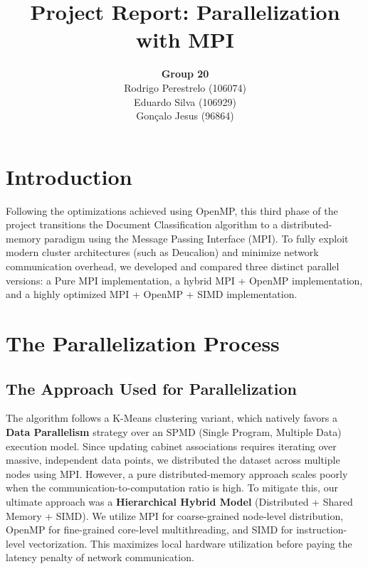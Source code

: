 \documentclass[12pt,a4paper]{article}
\title{\textbf{Project Report: Parallelization with MPI}}
\author{
    \textbf{Group 20} \\
    Rodrigo Perestrelo (106074) \\
    Eduardo Silva (106929) \\
    Gonçalo Jesus (96864)
}
\date{}
\begin{document}
\maketitle

\section{Introduction}

Following the optimizations achieved using OpenMP, this third phase of the project transitions the Document Classification algorithm to a distributed-memory paradigm using the Message Passing Interface (MPI). To fully exploit modern cluster architectures (such as Deucalion) and minimize network communication overhead, we developed and compared three distinct parallel versions: a Pure MPI implementation, a hybrid MPI + OpenMP implementation, and a highly optimized MPI + OpenMP + SIMD implementation.

\section{The Parallelization Process}

\subsection{The Approach Used for Parallelization}
The algorithm follows a K-Means clustering variant, which natively favors a \textbf{Data Parallelism} strategy over an SPMD (Single Program, Multiple Data) execution model. Since updating cabinet associations requires iterating over massive, independent data points, we distributed the dataset across multiple nodes using MPI.
However, a pure distributed-memory approach scales poorly when the communication-to-computation ratio is high. To mitigate this, our ultimate approach was a \textbf{Hierarchical Hybrid Model} (Distributed + Shared Memory + SIMD). We utilize MPI for coarse-grained node-level distribution, OpenMP for fine-grained core-level multithreading, and SIMD for instruction-level vectorization. This maximizes local hardware utilization before paying the latency penalty of network communication.
\end{document}
